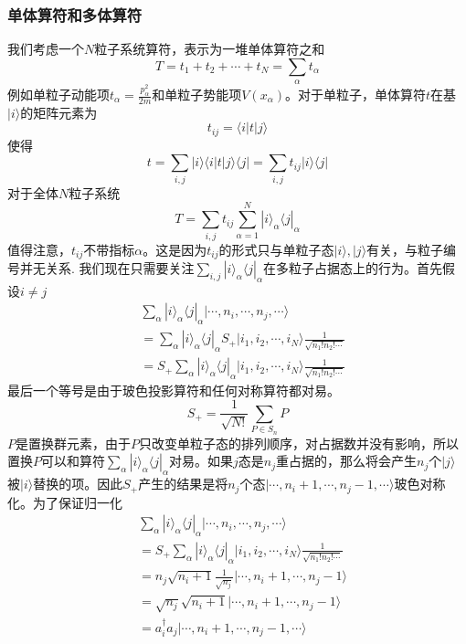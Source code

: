 \documentclass[12pt]{article}
\begin{document}
\subsubsection{单体算符和多体算符}
我们考虑一个$N$粒子系统算符，表示为一堆单体算符之和
\begin{equation*}
    T=t_1+t_2+\cdots+t_N=\sum_{\alpha}t_\alpha
\end{equation*}
例如单粒子动能项$t_\alpha=\frac{p_\alpha^2}{2m}$和单粒子势能项$V(x_\alpha)$。对于单粒子，单体算符$t$在基$|i\rangle$的矩阵元素为
\begin{equation*}
    t_{ij}=\langle i|t|j\rangle
\end{equation*}
使得
\begin{equation*}
    t=\sum_{i,j}|i\rangle\langle i|t|j\rangle\langle j|=\sum_{i,j}t_{ij}|i\rangle\langle j|
\end{equation*}
对于全体$N$粒子系统
\begin{equation*}
    T=\sum_{i,j}t_{ij}\sum_{\alpha=1}^N|i\rangle_\alpha\langle j|_\alpha
\end{equation*}
值得注意，$t_{ij}$不带指标$\alpha$。这是因为$t_{ij}$的形式只与单粒子态$|i\rangle,|j\rangle$有关，与粒子编号并无关系. 我们现在只需要关注$\sum_{i,j}|i\rangle_\alpha\langle j|_\alpha$在多粒子占据态上的行为。首先假设$i\neq j$
\begin{equation*}
    \begin{split}
        &\sum_{\alpha}|i\rangle_\alpha\langle j|_\alpha|\cdots,n_i,\cdots,n_j,\cdots\rangle\\
        &=\sum_{\alpha}|i\rangle_\alpha\langle j|_\alpha S_+|i_1,i_2,\cdots,i_N\rangle\frac{1}{\sqrt{n_1!n_2!\cdots}}\\
        &=S_+\sum_{\alpha}|i\rangle_\alpha\langle j|_\alpha|i_1,i_2,\cdots,i_N\rangle\frac{1}{\sqrt{n_1!n_2!\cdots}}
    \end{split}
\end{equation*}
最后一个等号是由于玻色投影算符和任何对称算符都对易。
\begin{equation*}
    S_+=\frac{1}{\sqrt{N!}}\sum_{P\in S_n}P
\end{equation*}
$P$是置换群元素，由于$P$只改变单粒子态的排列顺序，对占据数并没有影响，所以置换$P$可以和算符$\sum_\alpha|i\rangle_\alpha\langle j|_\alpha$对易。如果$j$态是$n_j$重占据的，那么将会产生$n_j$个$|j\rangle$被$|i\rangle$替换的项。因此$S_+$产生的结果是将$n_j$个态$|\cdots,n_i+1,\cdots,n_j-1,\cdots\rangle$玻色对称化。为了保证归一化
\begin{equation*}
    \begin{split}
        &\sum_{\alpha}|i\rangle_\alpha\langle j|_\alpha|\cdots,n_i,\cdots,n_j,\cdots\rangle\\
        &=S_+\sum_{\alpha}|i\rangle_\alpha\langle j|_\alpha|i_1,i_2,\cdots,i_N\rangle\frac{1}{\sqrt{n_1!n_2!\cdots}}\\
        &=n_j\sqrt{n_i+1}\frac{1}{\sqrt{n_j}}|\cdots,n_i+1,\cdots,n_j-1\rangle\\
        &=\sqrt{n_j}\sqrt{n_i+1}|\cdots,n_i+1,\cdots,n_j-1\rangle\\
        &=a_i^\dagger a_j|\cdots,n_i+1,\cdots,n_j-1,\cdots\rangle
    \end{split}
\end{equation*}
\end{document}
